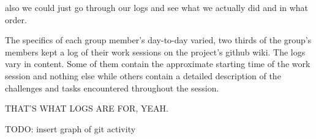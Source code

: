 also we could just go through our logs and see what we actually did and in what order.

The specifics of each group member's day-to-day varied, two thirds of the group's members kept a log of their work sessions on the project's github wiki. 
The logs vary in content. Some of them contain the approximate starting time of the work session and nothing else while others contain a detailed description of the challenges and tasks encountered throughout the session.


THAT'S WHAT LOGS ARE FOR, YEAH.

TODO: insert graph of git activity


